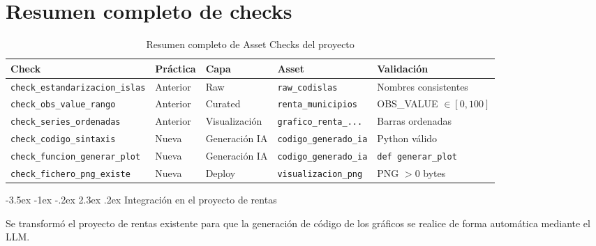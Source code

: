 \documentclass[11pt]{report}
\makeatletter
\renewcommand\chapter{\@startsection{chapter}{0}{\z@}%
    {-3.5ex \@plus -1ex \@minus -.2ex}%
    {2.3ex \@plus.2ex}%
    {\normalfont\Large\bfseries}}
\makeatother
\begin{document}
\section{Resumen completo de checks}

\begin{table}[H]
\centering
\small
\begin{tabular}{@{}lllll@{}}
\toprule
\textbf{Check} & \textbf{Práctica} & \textbf{Capa} & \textbf{Asset} & \textbf{Validación} \\
\midrule
\texttt{check\_estandarizacion\_islas} & Anterior & Raw & \texttt{raw\_codislas} & Nombres consistentes \\
\texttt{check\_obs\_value\_rango}      & Anterior & Curated & \texttt{renta\_municipios} & OBS\_VALUE $\in [0, 100]$ \\
\texttt{check\_series\_ordenadas}      & Anterior & Visualización & \texttt{grafico\_renta\_...} & Barras ordenadas \\
\midrule
\texttt{check\_codigo\_sintaxis}       & Nueva & Generación IA & \texttt{codigo\_generado\_ia} & Python válido \\
\texttt{check\_funcion\_generar\_plot} & Nueva & Generación IA & \texttt{codigo\_generado\_ia} & \texttt{def generar\_plot} \\
\texttt{check\_fichero\_png\_existe}   & Nueva & Deploy & \texttt{visualizacion\_png} & PNG $> 0$ bytes \\
\bottomrule
\end{tabular}
\caption{Resumen completo de Asset Checks del proyecto}
\end{table}


\chapter{Integración en el proyecto de rentas}

Se transformó el proyecto de rentas existente para que la generación de código de los gráficos
se realice de forma automática mediante el LLM.
\end{document}
